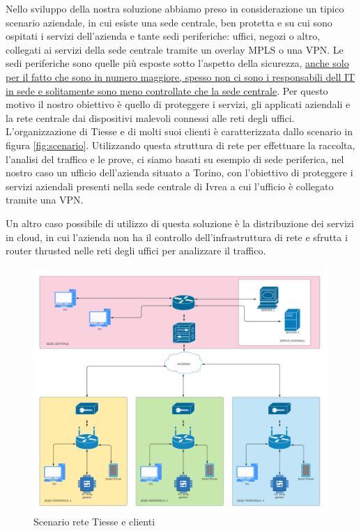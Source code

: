 Nello sviluppo della nostra soluzione abbiamo preso in considerazione un tipico scenario aziendale, in cui esiste una sede centrale, ben protetta e su cui sono ospitati i servizi dell'azienda e tante sedi periferiche: uffici, negozi o altro, collegati ai servizi della sede centrale tramite un overlay MPLS o una VPN.
Le sedi periferiche sono quelle più esposte sotto l'aspetto della sicurezza, \uline{anche solo per il fatto che sono in numero maggiore, spesso non ci sono i responsabili dell IT in sede e solitamente sono meno controllate che la sede centrale}. Per questo motivo il nostro obiettivo è quello di proteggere i servizi, gli applicati aziendali e la rete centrale dai dispositivi malevoli connessi alle reti degli uffici.
L'organizzazione di Tiesse e di molti suoi clienti è caratterizzata dallo scenario in figura \ref{fig:scenario}. Utilizzando questa struttura di rete per effettuare la raccolta, l'analisi del traffico e le prove, ci siamo basati su esempio di sede periferica, nel nostro caso un ufficio dell'azienda situato a Torino, con l'obiettivo di proteggere i servizi aziendali presenti nella sede centrale di Ivrea a cui l'ufficio è collegato tramite una VPN.

Un altro caso possibile di utilizzo di questa soluzione è la distribuzione dei servizi in cloud, in cui l'azienda non ha il controllo dell'infrastruttura di rete e sfrutta i router thrusted nelle reti degli uffici per analizzare il traffico.



\begin{figure}[]
    \label{fig:scenario_2}
    \includegraphics[width=\hsize]{images/introduzione/scenario.png}
    \caption{Scenario rete Tiesse e clienti}
    \centering
\end{figure}


